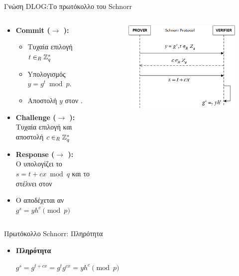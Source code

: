 \documentclass[handout]{beamer}
\begin{document}
\begin{frame}[allowframebreaks]{Γνώση DLOG:Το πρωτόκολλο του Schnorr}
\begin{columns}
\begin{small}
\begin{itemize}
\item  \textbf{Commit (\prv $\rightarrow$ \ver):} 
\begin{itemize}
\item Τυχαία επιλογή $t \in_R \mathbb{Z}^*_{q}$ 
\item Yπολογισμός $y = g^t \bmod{p}$. 
\item Αποστολή $y$  στον \ver. 
\end{itemize}
\item \textbf{Challenge (\ver $\rightarrow$ \prv):} \\  Τυχαία επιλογή και αποστολή $c \in_R \mathbb{Z}^*_{q}$
\item \textbf{Response (\prv $\rightarrow$ \ver):} \\   O \prv υπολογίζει το $s=t+cx \bmod{q}$ και το στέλνει στον \ver
\item  Ο \ver αποδέχεται αν\\ $g^s = yh^c \pmod{p}$
\end{itemize}
\end{small}
\begin{figure}
\includegraphics[width=1\textwidth]{schnorr.png}
\end{figure}
\end{columns}
\end{frame}

\begin{frame}{Πρωτόκολλο Schnorr: Πληρότητα}
 
\begin{itemize}
\item \textbf{Πληρότητα}\\

\pause
\begin{center}
$g^s = g^{t+cx} = g^t g^{cx} = yh^c \pmod{p}$
\end{center}



\end{itemize}
\end{frame}
\end{document}
